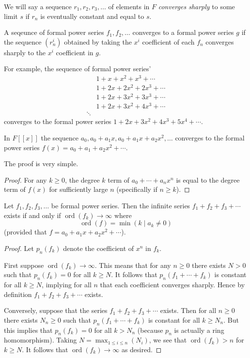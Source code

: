 \begin{definition}
We will say a sequence $r_1, r_2, r_3, \dots$ of elements in $F$ \textit{converges sharply} to some limit $s$ if $r_n$ is eventually constant and equal to $s$.
\end{definition}

\begin{definition}
A seqeunce of formal power series $f_1, f_2, \dots$ converges to a formal power series $g$ if the sequence $(r_n^i)$ obtained by taking the $x^i$ coefficient of each $f_n$ converges sharply to the $x^i$ coefficient in $g$.
\end{definition}

For example, the sequence of formal power series'
\begin{align*}
&1 + x + x^2 + x^3 + \cdots \\
&1 + 2x + 2x^2 + 2x^3 + \cdots \\
&1 + 2x + 3x^2 + 3x^3 + \cdots \\
&1 + 2x + 3x^2 + 4x^3 + \cdots \\
\ddots
\end{align*}
converges to the formal power series $1 + 2x + 3x^2 + 4x^3 + 5x^4 + \cdots$. 

\begin{lemma}
In $F[[x]]$ the sequence $a_0, a_0 + a_1x, a_0 + a_1x + a_2x^2, \dots$ converges to the formal power series $f(x) = a_0 + a_1 + a_2x^2 + \cdots$.
\end{lemma}
The proof is very simple.
\begin{proof}
For any $k \geq 0$, the degree $k$ term of $a_0 + \cdots + a_nx^n$ is equal to the degree term of $f(x)$ for sufficiently large $n$ (specifically if $n \geq k$).
\end{proof}

\begin{theorem}
Let $f_1, f_2, f_3, \dots$ be formal power series. Then the infinite series $f_1 + f_2 + f_3 + \cdots$ exists if and only if $\operatorname{ord}(f_k) \to \infty$ where 
\[\operatorname{ord}(f) = \min(k \mid a_k \neq 0)\] (provided that $f = a_0 + a_1x + a_2x^2 + \cdots$).
\end{theorem}
\begin{proof}
Let $p_n(f_k)$ denote the coefficient of $x^n$ in $f_k$. 

First suppose $\operatorname{ord}(f_k) \to \infty$. This means that for any $n \geq 0$ there exists $N > 0$ such that $p_n(f_k) = 0$ for all $k \geq N$. It follows that $p_n(f_1 + \cdots + f_k)$ is constant for all $k \geq N$, implying for all $n$ that each coefficient converges sharply. Hence by definition $f_1 + f_2 + f_3 + \cdots$ exists.

Conversely, suppose that the series $f_1 + f_2 + f_3 + \cdots$ exists. Then for all $n \geq 0$ there exists $N_n \geq 0$ such that $p_n(f_1 + \cdots + f_k)$ is constant for all $k \geq N_n$. But this implies that $p_n(f_k) = 0$ for all $k > N_n$ (because $p_n$ is actually a ring homomorphism). Taking $N = \max_{1 \leq i \leq n}(N_i)$, we see that $\operatorname{ord}(f_k) > n$ for $k \geq N$. It follows that $\operatorname{ord}(f_k) \to \infty$ as desired.
\end{proof}

